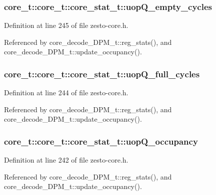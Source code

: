 \subsubsection[{uopQ\_\-empty\_\-cycles}]{ core\_\-t::core\_\-t::core\_\-stat\_\-t::uopQ\_\-empty\_\-cycles}\label{structcore__t_1_1core__stat__t_ccb25a222a9aeeb5fbb2118bc56896dc}




Definition at line 245 of file zesto-core.h.

Referenced by core\_\-decode\_\-DPM\_\-t::reg\_\-stats(), and core\_\-decode\_\-DPM\_\-t::update\_\-occupancy().
\subsubsection[{uopQ\_\-full\_\-cycles}]{ core\_\-t::core\_\-t::core\_\-stat\_\-t::uopQ\_\-full\_\-cycles}\label{structcore__t_1_1core__stat__t_c341421044c53a4ca6b854c817faa55a}




Definition at line 244 of file zesto-core.h.

Referenced by core\_\-decode\_\-DPM\_\-t::reg\_\-stats(), and core\_\-decode\_\-DPM\_\-t::update\_\-occupancy().
\subsubsection[{uopQ\_\-occupancy}]{ core\_\-t::core\_\-t::core\_\-stat\_\-t::uopQ\_\-occupancy}\label{structcore__t_1_1core__stat__t_8d3748dbc9ad936ed66382f8ee8c8d7b}




Definition at line 242 of file zesto-core.h.

Referenced by core\_\-decode\_\-DPM\_\-t::reg\_\-stats(), and core\_\-decode\_\-DPM\_\-t::update\_\-occupancy().
